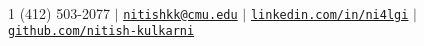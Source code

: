 \documentclass[10pt,a4paper,English]{article}
\begin{document}
 \\
\vspace{-5mm}

\small

\begin{center}
    \textsmaller{+}1 (412) 503-2077 $\vert$ \href{mailto:nitishkk@cmu.edu}{\texttt{nitishkk\mbox{}@\mbox{}cmu.edu}} $\vert$ \href{https://www.linkedin.com/in/ni4lgi}{\texttt{linkedin.com/in/ni4lgi}} $\vert$ \href{https://www.github.com/nitish-kulkarni}{\texttt{github.com/nitish-kulkarni}}\\
\end{center}


\end{document}
